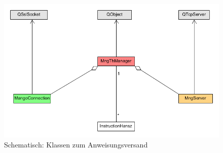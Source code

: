 \begin{figure}
\includegraphics[scale=.4]{classDiagInstr}
\caption{Schematisch: Klassen zum Anweisungsversand}
\label{inst_d}
\end{figure}

